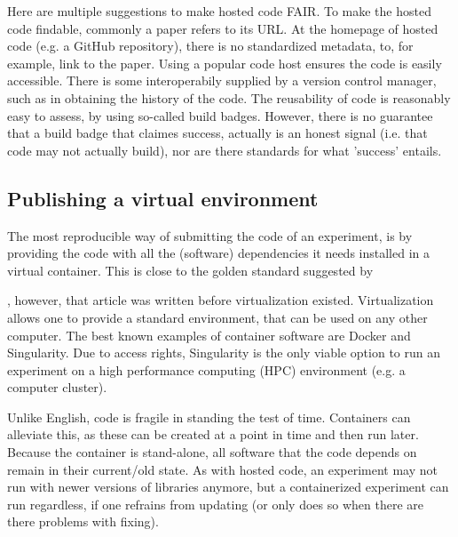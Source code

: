 
Here are multiple suggestions to make hosted code FAIR.
To make the hosted code findable, commonly a paper refers to its URL.
At the homepage of hosted code (e.g. a GitHub repository), 
there is no standardized metadata, to,
for example, link to the paper.
Using a popular code host ensures the code is easily accessible.
There is some interoperabily supplied by a version control manager,
such as in obtaining the history of the code.
The reusability of code is reasonably easy to assess, 
by using so-called build badges.
However, there is no guarantee that a build badge that claimes success,
actually is an honest signal (i.e. that code may not actually build),
nor are there standards for what 'success' entails.

\subsection{Publishing a virtual environment}

The most reproducible way of submitting the code of an experiment,
is by providing the code with all the (software) dependencies 
it needs installed in a virtual container.
This is close to the golden standard suggested by 
\cite{peng2011reproducible} 

,
however, that article was written before virtualization existed.
Virtualization allows one to provide a standard environment,
that can be used on any other computer.
The best known examples of container software are Docker and Singularity.
Due to access rights, Singularity is the only viable option to run
an experiment on a 
high performance computing (HPC) environment (e.g. a computer cluster).


Unlike English, code is fragile in standing the test of time.
Containers can alleviate this, as these can be created at a point
in time and then run later. Because the container is stand-alone,
all software that the code depends on remain in their current/old state.
As with hosted code, an experiment may not run with newer versions
of libraries anymore, but a containerized experiment can run regardless, 
if one refrains from updating (or only does so when there are there problems with fixing).

